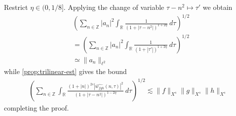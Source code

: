 \documentclass[12pt,reqno]{amsart}
\numberwithin{equation}{section}  %
\numberwithin{figure}{section}
\newcommand{\rr}{\mathbb{R}}
\newcommand{\zz}{\mathbb{Z}}
\newcommand{\wh}{\widehat}
\theoremstyle{plain}
\theoremstyle{definition}
\theoremstyle{remark}
\begin{document}
%
Restrict $\eta \in (0, 1/8]$. Applying the change of variable $\tau - n^2
\mapsto \tau'$ we obtain  %
%
\begin{equation*}
	\begin{split}
		& \left( \sum_{n \in \zz} | a_{n} |^2\int_{\rr} \frac{1}{\left( 1 + | \tau -
		n^2 | \right)^{1 + 2 \eta}} \ d \tau  
		\right)^{1/2} 
		\\
		& = \left ( \sum_{n \in \zz}
		| a_n |^2 
		\int_{\rr} \frac{1}{\left( 1 + | \tau' | \right)^{1 + 2 \eta}} \ d 
		\tau \right)^{1/2}
		\\
		& \simeq \|a_n\|_{\ell^2}
		\end{split}
\end{equation*}
while \autoref{prop:trilinear-est} gives the bound
\begin{equation*}
	\begin{split}
		\left ( \sum_{n \in \zz}\int_{\rr} \frac{\left (1 + |n| \right )^{2s} | \wh{w_{fgh}}(n, \tau) 
		|^2}{\left( 1 + | \tau - n^2 | \right)^{1 - 2 \eta}}\ d \tau 
		\right)^{1/2} \lesssim \|f\|_{X^s} \|g\|_{X^s} \|h\|_{X^s}
	\end{split}
\end{equation*}
%
completing the proof.
\qquad \qedsymbol
%
%

%
\end{document}
